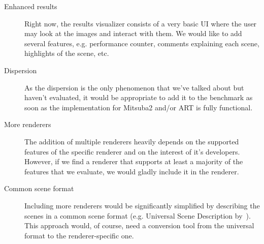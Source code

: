 \begin{description}
	\item[Enhanced results] Right now, the results visualizer consists of a very basic UI where the user may look at the images and interact with them. We would like to add several features, e.g. performance counter, comments explaining each scene, highlights of the scene, etc.
	\item[Dispersion] As the dispersion is the only phenomenon that we've talked about but haven't evaluated, it would be appropriate to add it to the benchmark as soon as the implementation for Mitsuba2 and/or ART is fully functional.
	\item[More renderers] The addition of multiple renderers heavily depends on the supported features of the specific renderer and on the interest of it's developers. However, if we find a renderer that supports at least a majority of the features that we evaluate, we would gladly include it in the renderer.
	\item[Common scene format] Including more renderers would be significantly simplified by describing the scenes in a common scene format (e.g. Universal Scene Description by~\citet{usdDoc}). This approach would, of course, need a conversion tool from the universal format to the renderer-specific one.
\end{description}
